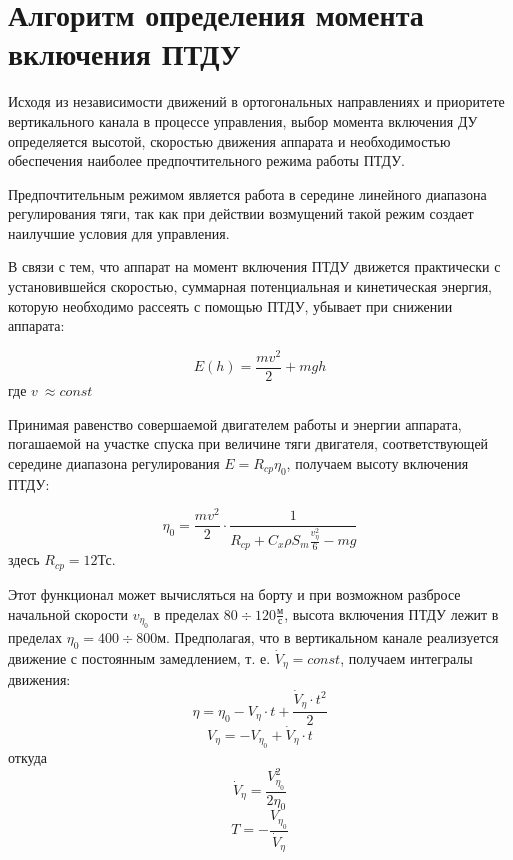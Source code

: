 \section{Алгоритм определения момента включения ПТДУ}
Исходя из независимости движений в ортогональных направлениях и приоритете вертикального канала в процессе управления, выбор момента включения ДУ определяется высотой, скоростью движения аппарата и необходимостью обеспечения наиболее предпочтительного режима работы ПТДУ.

Предпочтительным режимом является работа в середине линейного диапазона регулирования тяги, так как при действии возмущений такой режим создает наилучшие условия для управления.

В связи с тем, что аппарат на момент включения ПТДУ движется практически с установившейся скоростью, суммарная потенциальная и кинетическая энергия, которую необходимо рассеять с помощью ПТДУ, убывает при снижении аппарата:

\begin{equation}
E(h) = \frac{mv^2}{2} + mgh
\end{equation}
где $v \ \approx const$

Принимая равенство совершаемой двигателем работы и энергии аппарата, погашаемой на участке спуска при величине тяги двигателя, соответствующей середине диапазона регулирования $E = R_{cp} \eta_0$, получаем высоту включения ПТДУ:

\begin{equation}
\eta_0 = \frac{m v^2}{2} \cdot \frac{1}{R_{cp} + C_x \rho S_m \frac{v^2_\eta}{6} - mg}
\end{equation}
здесь $R_{cp} = 12$Тс.

Этот функционал может вычисляться на борту и при возможном разбросе начальной скорости $v_{\eta_0}$ в пределах $80 \div 120 \frac{\text{м}}{\text{с}}$, высота включения ПТДУ лежит в пределах $\eta_0 = 400 \div 800\text{м}$. 
Предполагая, что в вертикальном канале реализуется движение с постоянным замедлением, т. е. $\Dot{V}_\eta = const$, получаем интегралы движения:
\begin{equation}
\eta = \eta_0 - V_\eta \cdot t + \frac{\Dot{V}_\eta \cdot t^2}{2}
\label{eq:int-eq}
\end{equation}
\begin{equation}
V_\eta = -V_{\eta_0} + \Dot{V}_\eta \cdot t
\end{equation}
откуда
\begin{equation}
\Dot{V}_\eta = \frac{V^2_{\eta_0}}{2 \eta_0}
\label{eq:usk_v_eta}
\end{equation}
\begin{equation}
T = -\frac{V_{\eta_0}}{\Dot{V}_\eta}
\end{equation}

